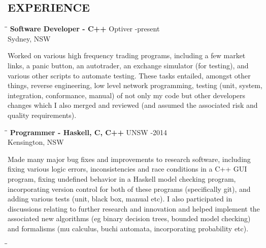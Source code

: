 \documentclass{res}
\begin{document}
\begin{resume}
\section{EXPERIENCE}
   \vspace{-0.1in}	
   \begin{tabbing}
   \hspace{2.3in}\= \hspace{2.6in}\= \kill %
    {\bf Software Developer - C++} \>Optiver -present\\
                             \>Sydney, NSW
   \end{tabbing}\vspace{-20pt}      %
    Worked on various high frequency trading programs, including a few market
    links, a panic button, an autotrader, an exchange simulator (for testing),
    and various other scripts to automate testing. These tasks entailed,
    amongst other things, reverse engineering, low level network programming,
    testing (unit, system, integration, conformance, manual) of not only my
    code but other developers changes which I also merged and reviewed (and
    assumed the associated risk and quality requirements).
   \begin{tabbing}
   \hspace{2.3in}\= \hspace{2.6in}\= \kill %
    {\bf Programmer - Haskell, C, C++} \>UNSW -2014\\
                     \>Kensington, NSW
   \end{tabbing}\vspace{-20pt}      %
    Made many major bug fixes and improvements to research software, including
    fixing various logic errors, inconsistencies and race conditions in a C++
    GUI program, fixing undefined behavior in a Haskell model checking program,
    incorporating version control for both of these programs (specifically
    git), and adding various tests (unit, black box, manual etc). I also
    participated in discussions relating to further research and innovation and
    helped implement the associated new algorithms (eg binary decision trees,
    bounded model checking) and formalisms (mu calculus, buchi automata,
    incorporating probability etc).
   \begin{tabbing}
   \hspace{2.3in}\= \hspace{2.6in}\= \kill %

\end{tabbing}
\end{resume}
\end{document}
